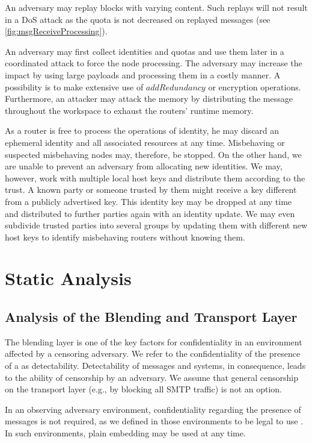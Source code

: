 An adversary may replay blocks with varying content. Such replays will not result in a DoS attack as the quota is not decreased on replayed messages (see \cref{fig:msgReceiveProcessing}).

An adversary may first collect identities and quotas and use them later in a coordinated attack to force the node processing. The adversary may increase the impact by using large payloads and processing them in a costly manner. A possibility is to make extensive use of $addRedundancy$ or encryption operations. Furthermore, an attacker may attack the memory by distributing the message throughout the workspace to exhaust the routers' runtime memory.

As a router is free to process the operations of identity, he may discard an ephemeral identity and all associated resources at any time. Misbehaving or suspected misbehaving nodes may, therefore, be stopped. On the other hand, we are unable to prevent an adversary from allocating new identities. We may, however, work with multiple local host keys and distribute them according to the trust. A known party or someone trusted by them might receive a key different from a publicly advertised key. This identity key may be dropped at any time and distributed to further parties again with an identity update. We may even subdivide trusted parties into several groups by updating them with different new host keys to identify misbehaving routers without knowing them. 

\chapter{Static Analysis}\label{sec:staticAnalysis}
\section{Analysis of the Blending and Transport Layer}\label{sec:analysisBlendingAndTransport}
The blending layer is one of the key factors for confidentiality in an environment affected by a censoring adversary. We refer to the confidentiality of the presence of a \VortexNode{} as detectability. Detectability of messages and systems, in consequence, leads to the ability of censorship by an adversary. We assume that general censorship on the transport layer (e.g., by blocking all SMTP traffic) is not an option.

In an observing adversary environment, confidentiality regarding the presence of messages is not required, as we defined in those environments to be legal to use \MessageVortex. In such environments, plain embedding may be used at any time.

